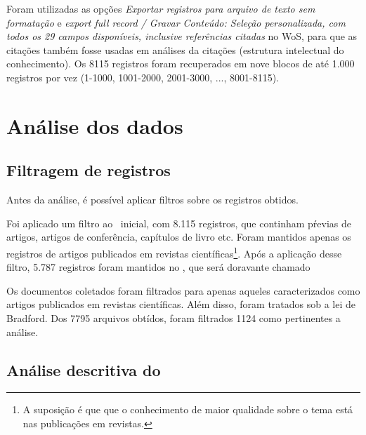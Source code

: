 Foram utilizadas as opções \textit{Exportar registros para arquivo de texto sem formatação} e \textit{export full record / Gravar Conteúdo: Seleção personalizada, com todos os 29 campos disponíveis, inclusive referências citadas} no WoS, para que as citações também fosse usadas em análises da citações (estrutura intelectual do conhecimento). Os 8115 registros foram recuperados em nove blocos de até 1.000 registros por vez (1-1000, 1001-2000, 2001-3000, ..., 8001-8115).


\section{Análise dos dados}

\subsection{Filtragem de registros}
Antes da análise, é possível aplicar filtros sobre os registros obtidos.

Foi aplicado um filtro ao \dataset\   inicial, com 8.115 registros, que continham pŕevias de artigos, artigos de conferência, capítulos de livro etc. Foram mantidos apenas os registros de artigos publicados em revistas científicas\footnote{A suposição é que que o conhecimento de maior qualidade sobre o tema está nas publicações em revistas.}. Após a aplicação desse filtro, 5.787 registros foram mantidos no \dataset, que será doravante chamado

Os documentos coletados foram filtrados para apenas aqueles caracterizados como artigos publicados em revistas científicas. Além disso, foram tratados sob a lei de Bradford. Dos 7795 arquivos obtídos, foram filtrados  1124 como pertinentes a análise.

\subsection{Análise descritiva do \dataset\   }

